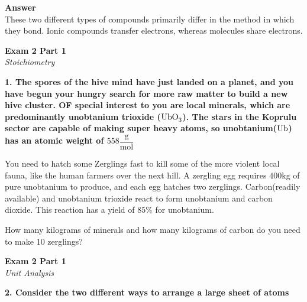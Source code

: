 \documentclass{article}
\begin{document}
    \textbf{Answer}\\
    These two different types of compounds primarily differ in the method in which they bond. Ionic compounds transfer electrons, whereas molecules share electrons.

    \pagebreak


    \begin{center}
        \textbf{Exam 2 Part 1}\\
        \textit{Stoichiometry}
    \end{center}
    \textbf{1. The spores of the hive mind have just landed on a planet, and you have begun your hungry search for more raw matter to build a new hive cluster. OF special interest to you are local minerals, which are predominantly unobtanium trioxide ($\ce{UbO_{3}}$). The stars in the Koprulu sector are capable of making super heavy atoms, so unobtanium($\ce{Ub}$) has an atomic weight of $558 \dfrac{\si{\gram}}{\si{\mol}}$}

    You need to hatch some Zerglings fast to kill some of the more violent local fauna, like the human farmers over the next hill. A zergling egg requires $400 \si{\kilo\gram}$ of pure unobtanium to produce, and each egg hatches two zerglings. Carbon(readily available) and unobtanium trioxide react to form unobtanium and carbon dioxide. This reaction has a yield of $85\%$ for unobtanium.

    How many kilograms of minerals and how many kilograms of carbon do you need to make 10 zerglings?

    \pagebreak

    \begin{center}
        \textbf{Exam 2 Part 1}\\
        \textit{Unit Analysis}
    \end{center}
    \textbf{2. Consider the two different ways to arrange a large sheet of atoms}
\end{document}
